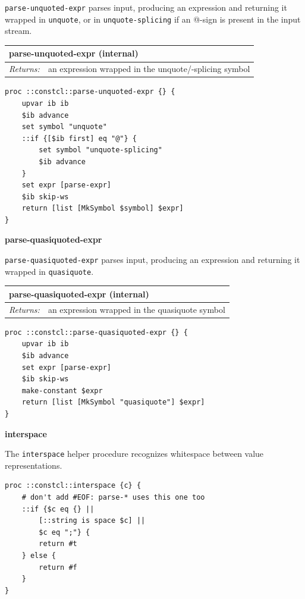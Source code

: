 \documentclass[twoside,9pt]{report}
\begin{document}
\texttt{parse-unquoted-expr} parses input, producing an expression and returning it wrapped in \texttt{unquote}, or in \texttt{unquote-splicing} if an @-sign is present in the input stream.

\begin{tabular}{ |l l| }
\hline
\multicolumn{2}{|l|}{parse-unquoted-expr (internal)} \\
\hline
\textit{Returns:} & an expression wrapped in the unquote/-splicing symbol \\
\hline
\end{tabular}

\noindent\makebox[\linewidth]{\rule{\linewidth}{0.4pt}}
\begin{lstlisting}
proc ::constcl::parse-unquoted-expr {} {
    upvar ib ib
    $ib advance
    set symbol "unquote"
    ::if {[$ib first] eq "@"} {
        set symbol "unquote-splicing"
        $ib advance
    }
    set expr [parse-expr]
    $ib skip-ws
    return [list [MkSymbol $symbol] $expr]
}
\end{lstlisting}
\noindent\makebox[\linewidth]{\rule{\linewidth}{0.4pt}}

\textbf{parse-quasiquoted-expr}


\texttt{parse-quasiquoted-expr} parses input, producing an expression and returning it wrapped in \texttt{quasiquote}.

\begin{tabular}{ |l l| }
\hline
\multicolumn{2}{|l|}{parse-quasiquoted-expr (internal)} \\
\hline
\textit{Returns:} & an expression wrapped in the quasiquote symbol \\
\hline
\end{tabular}

\noindent\makebox[\linewidth]{\rule{\linewidth}{0.4pt}}
\begin{lstlisting}
proc ::constcl::parse-quasiquoted-expr {} {
    upvar ib ib
    $ib advance
    set expr [parse-expr]
    $ib skip-ws
    make-constant $expr
    return [list [MkSymbol "quasiquote"] $expr]
}
\end{lstlisting}
\noindent\makebox[\linewidth]{\rule{\linewidth}{0.4pt}}

\textbf{interspace}


The \texttt{interspace} helper procedure recognizes whitespace between value representations.

\noindent\makebox[\linewidth]{\rule{\linewidth}{0.4pt}}
\begin{lstlisting}
proc ::constcl::interspace {c} {
    # don't add #EOF: parse-* uses this one too
    ::if {$c eq {} ||
        [::string is space $c] ||
        $c eq ";"} {
        return #t
    } else {
        return #f
    }
}
\end{lstlisting}
\noindent\makebox[\linewidth]{\rule{\linewidth}{0.4pt}}
\end{document}
